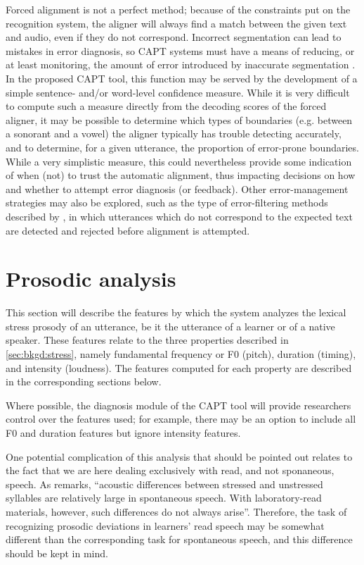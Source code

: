 	Forced alignment is not a perfect method; because of the constraints put on the recognition system, the aligner will always find a match between the given text and audio, even if they do not correspond. Incorrect segmentation can lead to mistakes in error diagnosis, so CAPT systems must have a means of reducing, or at least monitoring, the amount of error introduced by inaccurate segmentation \citep{Eskenazi2009}. 	
	In the proposed CAPT tool, this function may be served by the development of a simple sentence- and/or word-level confidence measure. 
	While it is very difficult to compute such a measure directly from the decoding scores of the forced aligner, it may be possible to determine which types of boundaries (e.g. between a sonorant and a vowel) the aligner typically has trouble detecting accurately, and to determine, for a given utterance, the proportion of error-prone boundaries. While a very simplistic measure, this could nevertheless provide some indication of when (not) to trust the automatic alignment, thus impacting decisions on how and whether to attempt error diagnosis (or feedback).
	Other error-management strategies may also be explored, such as the type of error-filtering methods described by \textcite{Mesbahi2011,Bonneau2012,Orosanu2012}, in which utterances which do not correspond to the expected text are detected and rejected before alignment is attempted.
	
\section{Prosodic analysis}
\label{sec:diag:prosody}

	This section will describe the features by which the system analyzes the lexical stress prosody of an utterance, be it the utterance of a learner or of a native speaker. These features relate to the three properties described in \cref{sec:bkgd:stress}, namely fundamental frequency or F0 (pitch), duration (timing), and intensity (loudness). The features computed for each property are described in the corresponding sections below.
	
	Where possible, the diagnosis module of the CAPT tool will provide researchers control over the features used; for example, there may be an option to include all F0 and duration features but ignore intensity features.
	
	One potential complication of this analysis that should be pointed out relates to the fact that we are here dealing exclusively with read, and not sponaneous, speech. As \textcite[p.~275]{Cutler2005} remarks, ``acoustic differences between stressed and unstressed syllables are relatively large in spontaneous speech. With laboratory-read materials, however, such differences do not always arise''. Therefore, the task of recognizing prosodic deviations in learners' read speech may be somewhat different than the corresponding task for spontaneous speech, and this difference should be kept in mind. 

